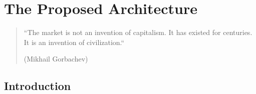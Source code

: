 
\chapter{The Proposed Architecture} \label{chapter:architecture}

\begin{quotation}
``The market is not an invention of capitalism. It has existed for centuries. It is an invention of civilization.``
\begin{flushright}
(Mikhail Gorbachev)
\end{flushright}
\end{quotation}



\section{Introduction}
